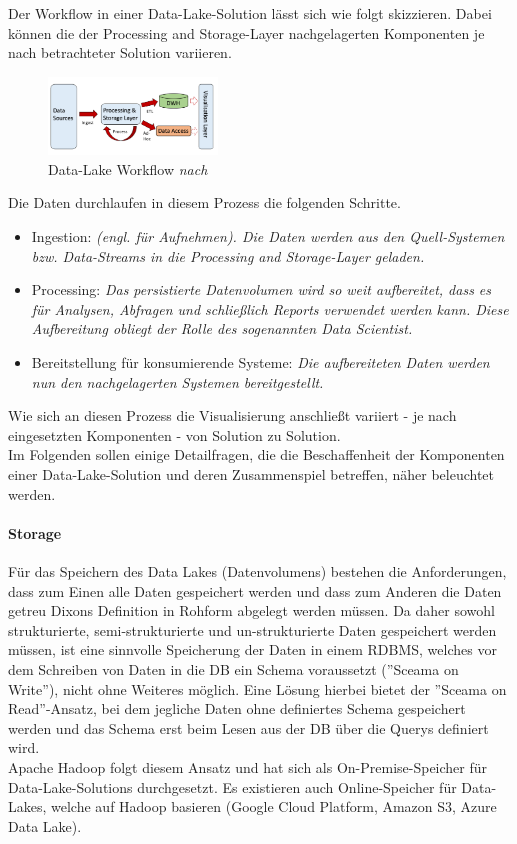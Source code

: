 \documentclass[twoside,twocolumn]{article}
\begin{document}
Der Workflow in einer Data-Lake-Solution lässt sich wie folgt skizzieren. Dabei können die der Processing and Storage-Layer nachgelagerten Komponenten je nach betrachteter Solution variieren.

\begin{figure}[h]
	\centering 
	\includegraphics[width=0.4\textwidth]{img/p4} 
	\caption{Data-Lake Workflow \textit{nach} \cite{src9}}	
\end{figure}

Die Daten durchlaufen in diesem Prozess die folgenden Schritte.
\begin{itemize}
	\item Ingestion: \textit{(engl. für Aufnehmen). Die Daten werden aus den Quell-Systemen bzw. Data-Streams in die Processing and Storage-Layer geladen.}
	\item Processing: \textit{Das persistierte Datenvolumen wird so weit aufbereitet, dass es für Analysen, Abfragen und schließlich Reports verwendet werden kann. Diese Aufbereitung obliegt der Rolle des sogenannten Data Scientist.\cite{src8}} 
	\item Bereitstellung für konsumierende Systeme: \textit{Die aufbereiteten Daten werden nun den nachgelagerten Systemen bereitgestellt.}
\end{itemize}
Wie sich an diesen Prozess die Visualisierung anschließt variiert - je nach eingesetzten Komponenten - von Solution zu Solution.\\

Im Folgenden sollen einige Detailfragen, die die Beschaffenheit der Komponenten einer Data-Lake-Solution und deren Zusammenspiel betreffen, näher beleuchtet werden.

\paragraph{Storage}
		Für das Speichern des Data Lakes (Datenvolumens) bestehen die Anforderungen, dass zum Einen alle Daten gespeichert werden und dass zum Anderen die Daten getreu Dixons Definition in Rohform abgelegt werden müssen. Da daher sowohl strukturierte, semi-strukturierte und un-strukturierte Daten gespeichert werden müssen, ist eine sinnvolle Speicherung der Daten in einem RDBMS, welches vor dem Schreiben von Daten in die DB ein Schema voraussetzt (''Sceama on Write''), nicht ohne Weiteres möglich. Eine Lösung hierbei bietet der ''Sceama on Read''-Ansatz, bei dem jegliche Daten ohne definiertes Schema gespeichert werden und das Schema erst beim Lesen aus der DB über die Querys definiert wird.\\
		Apache Hadoop folgt diesem Ansatz und hat sich als On-Premise-Speicher für Data-Lake-Solutions durchgesetzt. Es existieren auch Online-Speicher für Data-Lakes, welche auf Hadoop basieren (Google Cloud Platform, Amazon S3, Azure Data Lake).
		\cite{src8}
\end{document}
